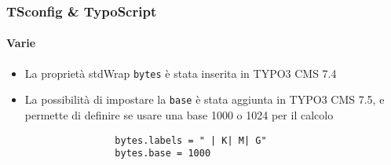 \begin{frame}[fragile]
	\frametitle{TSconfig \& TypoScript}
	\framesubtitle{Varie}

	\begin{itemize}

		\item La proprietà stdWrap \texttt{bytes} è stata inserita in TYPO3 CMS 7.4

		\item La possibilità di impostare la \texttt{base} è stata aggiunta in TYPO3 CMS 7.5,
			e permette di definire se usare una base 1000 o 1024 per il calcolo

			\begin{lstlisting}
				bytes.labels = " | K| M| G"
				bytes.base = 1000
			\end{lstlisting}

	\end{itemize}

\end{frame}

